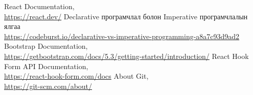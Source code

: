 \singlespace
{}
\begin{thebibliography}{}
	React Documentation,
   \\\url{https://react.dev/}
	Declarative програмчлал болон Imperative програмчлалын ялгаа
   \\\url{https://codeburst.io/declarative-vs-imperative-programming-a8a7c93d9ad2}
	Bootstrap Documentation,
   \\\url{https://getbootstrap.com/docs/5.3/getting-started/introduction/}
	React Hook Form API Documentation,
   \\\url{https://react-hook-form.com/docs}
	About Git,
   \\\url{https://git-scm.com/about/}

\end{thebibliography}